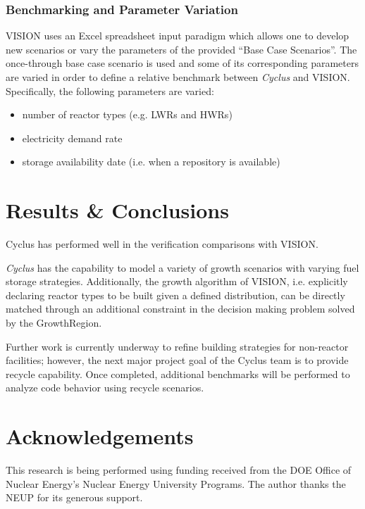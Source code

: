 \documentclass{anstrans}
\begin{document}
\subsubsection{Benchmarking and Parameter Variation}

VISION uses an Excel spreadsheet input paradigm which allows one to
develop new scenarios or vary the parameters of the provided ``Base
Case Scenarios''. The once-through base case scenario is used and some
of its corresponding parameters are varied in order to define a
relative benchmark between \emph{Cyclus} and VISION. Specifically, the
following parameters are varied:
\begin{itemize}
\item number of reactor types (e.g. LWRs and HWRs)
\item electricity demand rate
\item storage availability date (i.e. when a repository is available)
\end{itemize}

\section{Results \& Conclusions}
Cyclus has performed well in the verification comparisons with VISION.

\emph{Cyclus} has the capability to model a variety of growth
scenarios with varying fuel storage strategies.  Additionally, the
growth algorithm of VISION, i.e. explicitly declaring reactor types to
be built given a defined distribution, can be directly matched through
an additional constraint in the decision making problem solved by the
GrowthRegion.

Further work is currently underway to refine building strategies for
non-reactor facilities; however, the next major project goal of the
Cyclus team is to provide recycle capability. Once completed,
additional benchmarks will be performed to analyze code behavior using
recycle scenarios.

\section{Acknowledgements}
This research is being performed using funding received from the DOE
Office of Nuclear Energy's Nuclear Energy University Programs.  The
author thanks the NEUP for its generous support.

\end{document}
